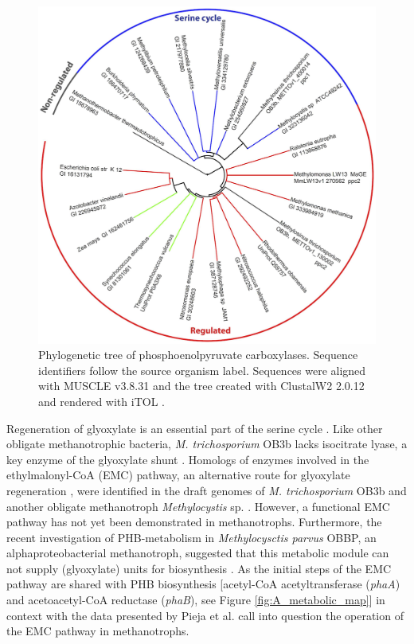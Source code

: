 \begin{figure}[H]
\centering
     \includegraphics[width=1.0\textwidth]{./tex/chapter1/figures/figure3.png}
     \begin{singlespace}
     \caption[Phylogenetic tree of phosphoenolpyruvate carboxylases.]{
        Phylogenetic tree of phosphoenolpyruvate carboxylases.
        Sequence identifiers follow the source organism label. Sequences were aligned with MUSCLE v3.8.31 \cite{edgar2004} and
        the tree created with ClustalW2 2.0.12 \cite{larkin2007} and rendered with iTOL \cite{letunic2007}.}
     \label{fig:B_pep}
     \end{singlespace}
\end{figure}

Regeneration of glyoxylate is an essential part of the serine cycle \cite{anthony1982, anthony2011, peyraud2009}.
Like other obligate methanotrophic bacteria, \textit{M. trichosporium} OB3b lacks isocitrate lyase, a key enzyme of the glyoxylate shunt \cite{trotsenko2008}.
Homologs of enzymes involved in the ethylmalonyl-CoA (EMC) pathway, an alternative route for glyoxylate regeneration \cite{peyraud2009}, were identified in the draft genomes of \textit{M. trichosporium} OB3b and another obligate methanotroph \textit{Methylocystis} sp. \cite{stein2010, stein2011}.
However, a functional EMC pathway has not yet been demonstrated in methanotrophs.
Furthermore, the recent investigation of PHB-metabolism in \textit{Methylocysctis parvus} OBBP, an alphaproteobacterial methanotroph, suggested that this metabolic module can not supply  (glyoxylate) units for biosynthesis \cite{pieja2011}.
As the initial steps of the EMC pathway are shared with PHB biosynthesis [acetyl-CoA acetyltransferase (\textit{phaA}) and acetoacetyl-CoA reductase (\textit{phaB}), see Figure \ref{fig:A_metabolic_map}] in context with the data presented by Pieja et al. \cite{pieja2011} call into question the operation of the EMC pathway in methanotrophs.

